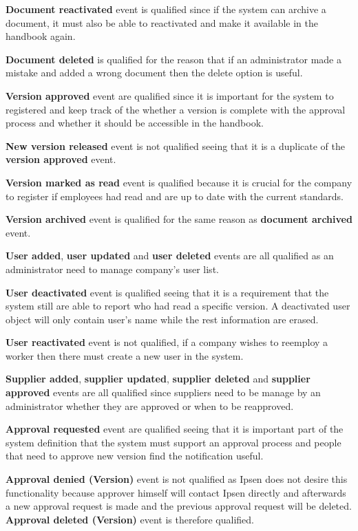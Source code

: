 \textbf{Document reactivated} event is qualified since if the system can archive a document, it must also be able to reactivated and make it available in the handbook again. 

\textbf{Document deleted} is qualified for the reason that if an administrator made a mistake and added a wrong document then the delete option is useful. 

\textbf{Version approved} event are qualified since it is important for the system to registered and keep track of the whether a version is complete with the approval process and whether it should be accessible in the handbook. 

\textbf{New version released} event is not qualified seeing that it is a duplicate of the \textbf{version approved} event. 

\textbf{Version marked as read} event is qualified because it is crucial for the company to register if employees had read and are up to date with the current standards. 

\textbf{Version archived} event is qualified for the same reason as \textbf{document archived} event.

\textbf{User added}, \textbf{user updated} and \textbf{user deleted} events are all qualified as an administrator need to manage company's user list. 

\textbf{User deactivated} event is qualified seeing that it is a requirement that the system still are able to report who had read a specific version. A deactivated user object will only contain user's name while the rest information are erased. 

\textbf{User reactivated} event is not qualified, if a company wishes to reemploy a worker then there must create a new user in the system. 


\textbf{Supplier added}, \textbf{supplier updated},  \textbf{supplier deleted} and \textbf{supplier approved} events are all qualified since suppliers need to be manage by an administrator whether they are approved or when to be reapproved. 

\textbf{Approval requested} event are qualified seeing that it is important part of the system definition that the system must support an approval process and people that need to approve new version find the notification useful. 

 \textbf{Approval denied (Version)} event is not qualified as Ipsen does not desire this functionality because approver himself will contact Ipsen directly and afterwards a new approval request is made and the previous approval request will be deleted. \textbf{Approval deleted (Version)} event is therefore qualified.

